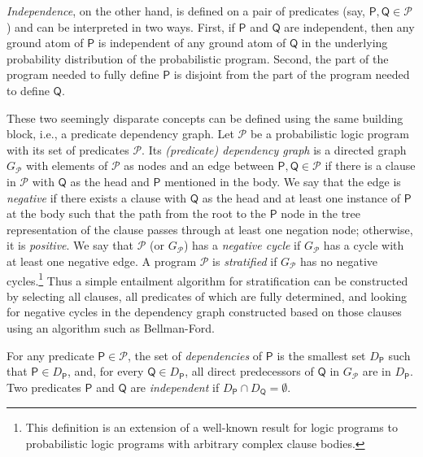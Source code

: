 \documentclass[runningheads]{llncs}
\newcommand{\predicates}{\mathcal{P}}
\begin{document}
\emph{Independence}, on the other hand, is defined on a pair of predicates (say,
$\mathsf{P}, \mathsf{Q} \in \mathcal{P}$) and can be interpreted in two ways.
First, if $\mathsf{P}$ and $\mathsf{Q}$ are independent, then any ground atom of
$\mathsf{P}$ is independent of any ground atom of $\mathsf{Q}$ in the underlying
probability distribution of the probabilistic program. Second, the part of the
program needed to fully define $\mathsf{P}$ is disjoint from the part of the
program needed to define $\mathsf{Q}$.

These two seemingly disparate concepts can be defined using the same building
block, i.e., a predicate dependency graph. Let $\mathscr{P}$ be a probabilistic
logic program with its set of predicates $\predicates{}$. Its \emph{(predicate)
  dependency graph} is a directed graph $G_{\mathscr{P}}$ with elements of
$\predicates{}$ as nodes and an edge between $\mathsf{P}, \mathsf{Q} \in
\predicates{}$ if there is a clause in $\mathscr{P}$ with $\mathsf{Q}$ as the
head and $\mathsf{P}$ mentioned in the body. We say that the edge is
\emph{negative} if there exists a clause with $\mathsf{Q}$ as the head and at
least one instance of $\mathsf{P}$ at the body such that the path from the root
to the $\mathsf{P}$ node in the tree representation of the clause passes through
at least one negation node; otherwise, it is \emph{positive}. We say that
$\mathscr{P}$ (or $G_{\mathscr{P}}$) has a \emph{negative cycle} if
$G_{\mathscr{P}}$ has a cycle with at least one negative edge. A program
$\mathscr{P}$ is \emph{stratified} if $G_{\mathscr{P}}$ has no negative
cycles.\footnote{This definition is an extension of a well-known result for
  logic programs \cite{DBLP:journals/jlp/BalbinPRM91} to probabilistic logic
  programs with arbitrary complex clause bodies.} Thus a simple entailment
algorithm for stratification can be constructed by selecting all clauses, all
predicates of which are fully determined, and looking for negative cycles in the
dependency graph constructed based on those clauses using an algorithm such as
Bellman-Ford.

For any predicate $\mathsf{P} \in \predicates{}$, the set of \emph{dependencies}
of $\mathsf{P}$ is the smallest set $D_{\mathsf{P}}$ such that $\mathsf{P} \in
D_{\mathsf{P}}$, and, for every $\mathsf{Q} \in D_{\mathsf{P}}$, all direct
predecessors of $\mathsf{Q}$ in $G_{\mathscr{P}}$ are in $D_{\mathsf{P}}$. Two
predicates $\mathsf{P}$ and $\mathsf{Q}$ are \emph{independent} if
$D_{\mathsf{P}} \cap D_{\mathsf{Q}} = \emptyset$.
\end{document}
